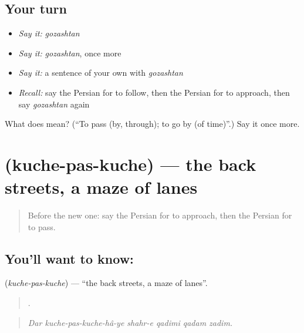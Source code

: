 \subsection*{Your turn}
\begin{itemize}
\raggedright
  \item \emph{Say it:} \emph{gozashtan}
  \item \emph{Say it:} \emph{gozashtan}, once more
  \item \emph{Say it:} a sentence of your own with \emph{gozashtan}
  \item \emph{Recall:} say the Persian for to follow, then the Persian for to approach, then say \emph{gozashtan} again
\end{itemize}

\begin{tcolorbox}[breakable,colback=teal!4,colframe=teal!35!black,title={Before you move on}]
What does  mean? (\textquotedblleft{}To pass (by, through); to go by (of time)\textquotedblright{}.) Say it once more.
\end{tcolorbox}
\section[\texorpdfstring{\fa{کوچه} \fa{پس} \fa{کوچه} (kuche-pas-kuche)}{کوچه پس کوچه (kuche-pas-kuche)}]{   (kuche-pas-kuche) — the back streets, a maze of lanes}

\label{lesson:FA-C449-kuche-pas-kuche}



\begin{quote}
Before the new one: say the Persian for to approach, then the Persian for to pass.
\end{quote}

\subsection*{You'll want to know:   }
\textbf{  } (\emph{kuche-pas-kuche}) — \textquotedblleft{}the back streets, a maze of lanes\textquotedblright{}.

\begin{quote}
        .
\end{quote}

\begin{quote}
\emph{Dar kuche-pas-kuche-hâ-ye shahr-e qadimi qadam zadim.}
\end{quote}

